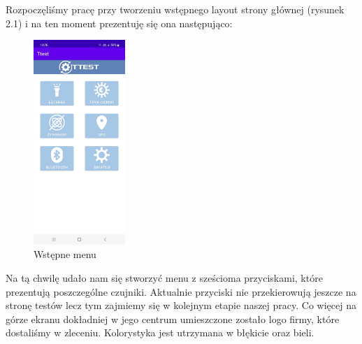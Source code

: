 Rozpoczęliśmy pracę przy tworzeniu wstępnego layout strony głównej (rysunek 2.1) i na ten moment prezentuję się ona następująco: \newline 
 \begin{figure}[!hbt]
	\begin{center}
		\includegraphics[angle=360, width=0.31\textwidth]{rys/menu.jpg}
		\caption{Wstępne menu}
		\label{rys:Menu}
	\end{center}
\end{figure}
\newpage
Na tą chwilę udało nam się stworzyć menu z sześcioma przyciskami, które prezentują poszczególne czujniki. Aktualnie przyciski nie przekierowują jeszcze na stronę testów lecz tym zajmiemy się w kolejnym etapie naszej pracy. Co więcej na górze ekranu dokładniej w jego centrum umieszczone zostało logo firmy, które dostaliśmy w zleceniu. Kolorystyka jest utrzymana w błękicie oraz bieli. 

